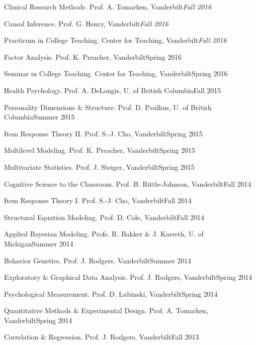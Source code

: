 \begin{etaremune}
\item Clinical Research Methods. Prof. A. Tomarken, Vanderbilt\hfill{\textit{Fall 2016}}
\item Causal Inference. Prof. G. Henry, Vanderbilt\hfill{\textit{Fall 2016}}
\item Practicum in College Teaching. Center for Teaching, Vanderbilt\hfill{\textit{Fall 2016}}
\item Factor Analysis. Prof. K. Preacher, Vanderbilt\hfill{Spring 2016}
\item Seminar in College Teaching. Center for Teaching, Vanderbilt\hfill{Spring 2016}
\item Health Psychology.  Prof. A. DeLongis, U. of British Columbia\hfill{Fall 2015}
\item Personality Dimensions \& Structure.  Prof. D. Paulhus, U. of British Columbia\hfill{Summer 2015}
\item Item Response Theory \textrm{II}. Prof. S.-J. Cho, Vanderbilt\hfill{Spring 2015}
\item Multilevel Modeling. Prof. K. Preacher, Vanderbilt\hfill{Spring 2015}
\item Multivariate Statistics. Prof. J. Steiger, Vanderbilt\hfill{Spring 2015}
\item Cognitive Science to the Classroom. Prof. B. Rittle-Johnson, Vanderbilt\hfill{Fall 2014}
\item Item Response Theory \textrm{I}. Prof. S.-J. Cho, Vanderbilt\hfill{Fall 2014}
\item Structural Equation Modeling. Prof. D. Cole, Vanderbilt\hfill{Fall 2014}
\item Applied Bayesian Modeling. Profs. R. Bakker \& J. Karreth, U. of Michigan\hfill{Summer 2014}
\item Behavior Genetics. Prof. J. Rodgers, Vanderbilt\hfill{Summer 2014}
\item Exploratory \& Graphical Data Analysis. Prof. J. Rodgers, Vanderbilt\hfill{Spring 2014}
\item Psychological Measurement. Prof. D. Lubinski, Vanderbilt\hfill{Spring 2014}
\item Quantitative Methods \& Experimental Design. Prof. A. Tomarken, Vanderbilt\hfill{Spring 2014}
\item Correlation \& Regression. Prof. J. Rodgers, Vanderbilt\hfill{Fall 2013}

\end{etaremune}
